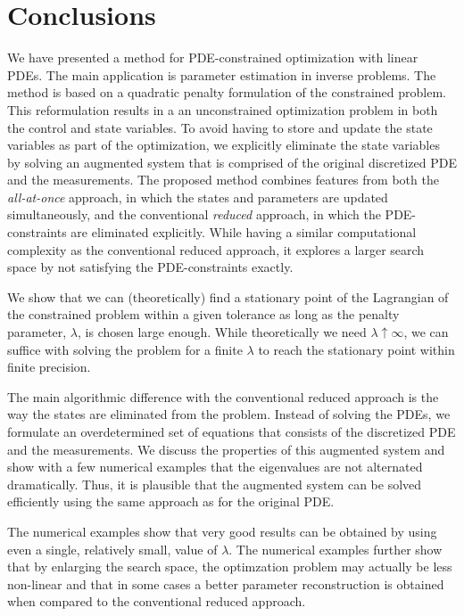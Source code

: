 \documentclass{iopart}
\begin{document}
\section{Conclusions}
\label{conclusion}
We have presented a method for PDE-constrained optimization with linear PDEs. The main application
is parameter estimation in inverse problems.
The method is based on a quadratic penalty formulation of the constrained problem. This reformulation
results in a an unconstrained optimization problem in both the control and state variables.
To avoid having to store and update the state variables as part of the optimization, we explicitly eliminate
the state variables by solving an augmented system that is comprised of the original discretized PDE and the measurements. 
The proposed method combines features from both the \emph{all-at-once}
approach, in which the states and parameters are updated simultaneously, and
the conventional \emph{reduced} approach, in which the PDE-constraints are eliminated explicitly.
While having a similar computational complexity as the conventional reduced approach, it explores
a larger search space by not satisfying the PDE-constraints exactly. 

We show that we can (theoretically)
find a stationary point of the Lagrangian of the constrained problem within a given tolerance as long as the penalty parameter, $\lambda$,
is chosen large enough. While theoretically we need $\lambda \uparrow \infty$, we can suffice with solving the problem
for a finite $\lambda$ to reach the stationary point within finite precision. 

The main algorithmic difference with the conventional reduced approach is the way the states are eliminated from the problem.
Instead of solving the PDEs, we formulate an overdetermined set of equations that consists of the discretized PDE and the measurements.
We discuss the properties of this augmented system and show with a few numerical examples that the eigenvalues are not alternated dramatically.
Thus, it is plausible that the augmented system can be solved efficiently using the same approach as for the original PDE.

The numerical examples show that
very good results can be obtained by using even a single, relatively small, value of $\lambda$.
The numerical examples further show that by enlarging the search space, the optimzation problem
may actually be less non-linear and that in some cases a better parameter reconstruction 
is obtained when compared to the conventional reduced approach.
\end{document}
